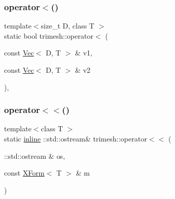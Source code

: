 \mbox{\label{namespacetrimesh_a015e02214c89c581ddc5692c68f7a019}} 
\subsubsection{\texorpdfstring{operator$<$()}{operator<()}}
{\footnotesize\ttfamily template$<$size\+\_\+t D, class T $>$ \\
static bool trimesh\+::operator$<$ (\begin{DoxyParamCaption}\item[{const \hyperlink{classtrimesh_1_1Vec}{Vec}$<$ D, T $>$ \&}]{v1,  }\item[{const \hyperlink{classtrimesh_1_1Vec}{Vec}$<$ D, T $>$ \&}]{v2 }\end{DoxyParamCaption})\hspace{0.3cm}{\ttfamily [inline]}, {\ttfamily [static]}}

\mbox{\label{namespacetrimesh_a9989ea6db6b00c754bf2677f9eac10d4}} 
\subsubsection{\texorpdfstring{operator$<$$<$()}{operator<<()}\hspace{0.1cm}{\footnotesize\ttfamily [1/2]}}
{\footnotesize\ttfamily template$<$class T $>$ \\
static \hyperlink{XForm_8h_a00d24c7231be28dbaf71f5408f30e44c}{inline} \+::std\+::ostream\& trimesh\+::operator$<$$<$ (\begin{DoxyParamCaption}\item[{\+::std\+::ostream \&}]{os,  }\item[{const \hyperlink{classtrimesh_1_1XForm}{X\+Form}$<$ T $>$ \&}]{m }\end{DoxyParamCaption})\hspace{0.3cm}{\ttfamily [static]}}

\mbox{\label{namespacetrimesh_a52735717a3893704a310000a5fee0269}} 
